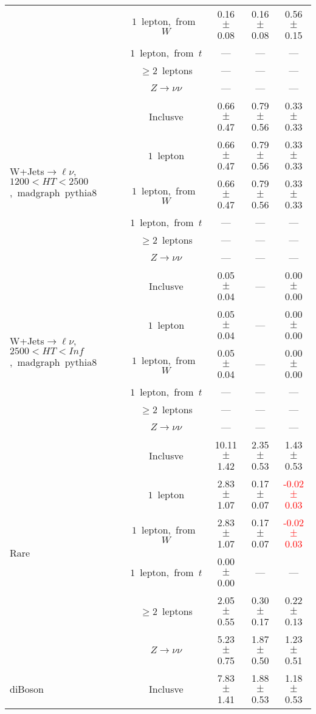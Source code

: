\documentclass{article}
\begin{document}
\begin{longtable}{|l|c|c|c|c|}
 & $1$~lepton,~from~$W$  & 0.16 $\pm$ 0.08  & 0.16 $\pm$ 0.08  & 0.56 $\pm$ 0.15 \\* 
 & $1$~lepton,~from~$t$  & ---  & ---  & --- \\* 
 & $\ge2$~leptons  & ---  & ---  & --- \\* 
 & $Z\rightarrow\nu\nu$  & ---  & ---  & --- \\* 
\hline 
\multirow{6}{*}{W+Jets$\rightarrow\ell\nu$,~$1200<HT<2500$,~madgraph~pythia8} & Inclusve  & 0.66 $\pm$ 0.47  & 0.79 $\pm$ 0.56  & 0.33 $\pm$ 0.33 \\* 
 & $1$~lepton  & 0.66 $\pm$ 0.47  & 0.79 $\pm$ 0.56  & 0.33 $\pm$ 0.33 \\* 
 & $1$~lepton,~from~$W$  & 0.66 $\pm$ 0.47  & 0.79 $\pm$ 0.56  & 0.33 $\pm$ 0.33 \\* 
 & $1$~lepton,~from~$t$  & ---  & ---  & --- \\* 
 & $\ge2$~leptons  & ---  & ---  & --- \\* 
 & $Z\rightarrow\nu\nu$  & ---  & ---  & --- \\* 
\hline 
\multirow{6}{*}{W+Jets$\rightarrow\ell\nu$,~$2500<HT<Inf$,~madgraph~pythia8} & Inclusve  & 0.05 $\pm$ 0.04  & ---  & 0.00 $\pm$ 0.00 \\* 
 & $1$~lepton  & 0.05 $\pm$ 0.04  & ---  & 0.00 $\pm$ 0.00 \\* 
 & $1$~lepton,~from~$W$  & 0.05 $\pm$ 0.04  & ---  & 0.00 $\pm$ 0.00 \\* 
 & $1$~lepton,~from~$t$  & ---  & ---  & --- \\* 
 & $\ge2$~leptons  & ---  & ---  & --- \\* 
 & $Z\rightarrow\nu\nu$  & ---  & ---  & --- \\* 
\hline 
\multirow{6}{*}{Rare} & Inclusve  & 10.11 $\pm$ 1.42  & 2.35 $\pm$ 0.53  & 1.43 $\pm$ 0.53 \\* 
 & $1$~lepton  & 2.83 $\pm$ 1.07  & 0.17 $\pm$ 0.07  & \textcolor{red}{ -0.02 $\pm$ 0.03 } \\* 
 & $1$~lepton,~from~$W$  & 2.83 $\pm$ 1.07  & 0.17 $\pm$ 0.07  & \textcolor{red}{ -0.02 $\pm$ 0.03 } \\* 
 & $1$~lepton,~from~$t$  & 0.00 $\pm$ 0.00  & ---  & --- \\* 
 & $\ge2$~leptons  & 2.05 $\pm$ 0.55  & 0.30 $\pm$ 0.17  & 0.22 $\pm$ 0.13 \\* 
 & $Z\rightarrow\nu\nu$  & 5.23 $\pm$ 0.75  & 1.87 $\pm$ 0.50  & 1.23 $\pm$ 0.51 \\* 
\hline 
\multirow{6}{*}{diBoson} & Inclusve  & 7.83 $\pm$ 1.41  & 1.88 $\pm$ 0.53  & 1.18 $\pm$ 0.53 \\* 

\end{longtable}
\end{document}
